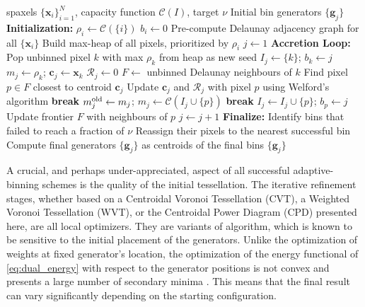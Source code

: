 \documentclass[fleqn,usenatbib]{mnras}
\begin{document}
\begin{algorithm}[t]
\caption{BinAccretion}
\label{alg:powerbin_accretion}
\begin{algorithmic}
\Require spaxels $\{\mathbf{x}_i\}_{i=1}^N$, capacity function $\mathcal{C}(I)$, target $\nu$
\Ensure Initial bin generators $\{\mathbf{g}_j\}$
\Statex
\State \textbf{Initialization:}
\State $\rho_i \gets \mathcal{C}(\{i\})$ 
\State $b_i \gets 0$ 
\State Pre-compute Delaunay adjacency graph for all $\{\mathbf{x}_i\}$
\State Build max-heap of all pixels, prioritized by $\rho_i$
\State $j \gets 1$ 
\Statex
\State \textbf{Accretion Loop:}
    \State Pop unbinned pixel $k$ with max $\rho_k$ from heap as new seed
    \State $I_j \gets \{k\}$; \quad $b_k \gets j$
    \State $m_j \gets \rho_k$; \quad $\mathbf{c}_j \gets \mathbf{x}_k$
    \State $\mathcal{R}_j \gets 0$ 
    \State $F \gets$ unbinned Delaunay neighbours of $k$
        \State Find pixel $p \in F$ closest to centroid $\mathbf{c}_j$
        \State Update $\mathbf{c}_j$ and $\mathcal{R}_j$ with pixel $p$ using Welford's algorithm
         \State \textbf{break} \EndIf
        \State $m_j^{\rm old} \gets m_j$; \quad $m_j \gets \mathcal{C}(I_j \cup \{p\})$
          \State \textbf{break} \EndIf
        \State $I_j \gets I_j \cup \{p\}$; \quad $b_p \gets j$
        \State Update frontier $F$ with neighbours of $p$
    \EndWhile
    \State $j \gets j + 1$
\EndWhile
\Statex
\State \textbf{Finalize:}
\State Identify bins that failed to reach a fraction of $\nu$
\State Reassign their pixels to the nearest successful bin
\State Compute final generators $\{\mathbf{g}_j\}$ as centroids of the final bins
\State \Return $\{\mathbf{g}_j\}$
\end{algorithmic}
\end{algorithm}

A crucial, and perhaps under-appreciated, aspect of all successful adaptive-binning schemes is the quality of the initial tessellation. The iterative refinement stages, whether based on a Centroidal Voronoi Tessellation (CVT), a Weighted Voronoi Tessellation (WVT), or the Centroidal Power Diagram (CPD) presented here, are all local optimizers. They are variants of \citet{Lloyd1982} algorithm, which is known to be sensitive to the initial placement of the generators. Unlike the optimization of weights at fixed generator's location, the optimization of the energy functional of \autoref{eq:dual_energy} with respect to the generator positions is not convex and presents a large number of secondary minima \citep[see][fig.~4]{Levy2015}. This means that the final result can vary significantly depending on the starting configuration.
\end{document}

